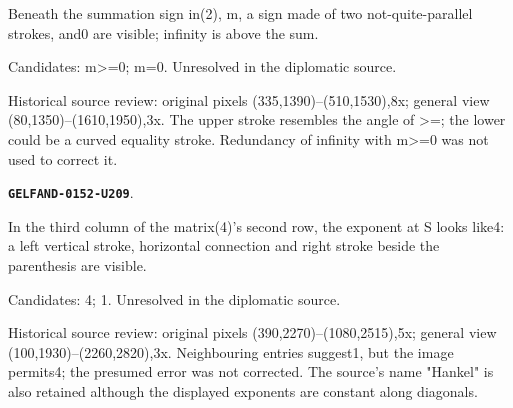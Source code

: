 \documentclass[11pt]{article}
\theoremstyle{definition}
\theoremstyle{remark}
\begin{document}
Beneath the summation sign in(2), m, a sign made of two not-quite-parallel strokes, and0 are visible; infinity is above the sum.\par
Candidates: m>=0; m=0. Unresolved in the diplomatic source.\par
Historical source review: original pixels (335,1390)–(510,1530),8x; general view (80,1350)–(1610,1950),3x. The upper stroke resembles the angle of >=; the lower could be a curved equality stroke. Redundancy of infinity with m>=0 was not used to correct it.\par\medskip
\par\noindent\leavevmode{}\label{GELFAND-0152-U209}\label{GELFAND-P001399:matrix-row-2-col-3:note}\textbf{\texttt{GELFAND-0152-U209}}.\nopagebreak[4]\par
In the third column of the matrix(4)'s second row, the exponent at S looks like4: a left vertical stroke, horizontal connection and right stroke beside the parenthesis are visible.\par
Candidates: 4; 1. Unresolved in the diplomatic source.\par
Historical source review: original pixels (390,2270)–(1080,2515),5x; general view (100,1930)–(2260,2820),3x. Neighbouring entries suggest1, but the image permits4; the presumed error was not corrected. The source's name "Hankel" is also retained although the displayed exponents are constant along diagonals.\par\medskip
\end{document}
